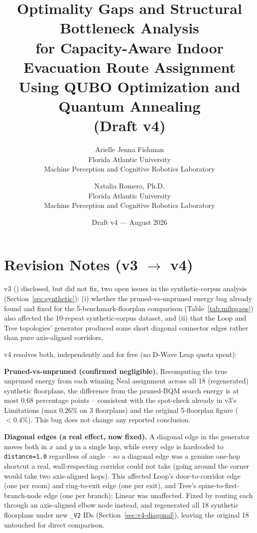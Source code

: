 \documentclass[11pt]{article}
\title{\textbf{Optimality Gaps and Structural Bottleneck Analysis \\
for Capacity-Aware Indoor Evacuation Route Assignment \\
Using QUBO Optimization and Quantum Annealing} \\ \large (Draft v4)}
\author{
Arielle Jenna Fishman \\
\small Florida Atlantic University \\
\small Machine Perception and Cognitive Robotics Laboratory
\and
Natalia Romero, Ph.D. \\
\small Florida Atlantic University \\
\small Machine Perception and Cognitive Robotics Laboratory
}
\date{Draft v4 --- August 2026}
\begin{document}
\maketitle

\section*{Revision Notes (v3 $\to$ v4)}
\label{sec:revision-notes-v4}

v3 () disclosed, but did not fix, two open issues in the synthetic-corpus analysis (Section~\ref{sec:synthetic}): (i) whether the pruned-vs-unpruned energy bug already found and fixed for the 5-benchmark-floorplan comparison (Table~\ref{tab:milpgaps}) also affected the 10-repeat synthetic-corpus dataset, and (ii) that the Loop and Tree topologies' generator produced some short diagonal connector edges rather than pure axis-aligned corridors.

v4 resolves both, independently and for free (no D-Wave Leap quota spent):

\textbf{Pruned-vs-unpruned (confirmed negligible).} Recomputing the true unpruned energy from each winning Neal assignment across all 18 (regenerated) synthetic floorplans, the difference from the pruned-BQM search energy is at most 0.68 percentage points -- consistent with the spot-check already in v3's Limitations (max 0.26\% on 3 floorplans) and the original 5-floorplan figure ($<0.4\%$). This bug does not change any reported conclusion.

\textbf{Diagonal edges (a real effect, now fixed).} A diagonal edge in the generator moves both in $x$ and $y$ in a single hop, while every edge is hardcoded to \texttt{distance=1.0} regardless of angle -- so a diagonal edge was a genuine one-hop shortcut a real, wall-respecting corridor could not take (going around the corner would take two axis-aligned hops). This affected Loop's door-to-corridor edge (one per room) and ring-to-exit edge (one per exit), and Tree's spine-to-first-branch-node edge (one per branch); Linear was unaffected. Fixed by routing each through an axis-aligned elbow node instead, and regenerated all 18 synthetic floorplans under new \texttt{\_V2} IDs (Section~\ref{sec:v4-diagonal}), leaving the original 18 untouched for direct comparison.
\end{document}
